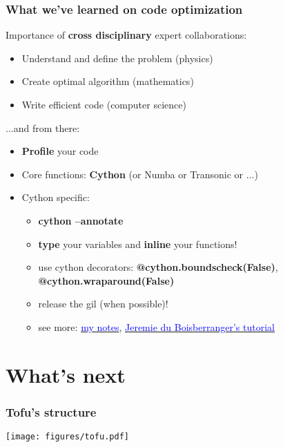 \documentclass[10pt]{beamer}
\begin{document}
\begin{frame}
\frametitle{What we've learned on code optimization}

Importance of \textbf{cross disciplinary} expert collaborations:

	\begin{itemize}
		\item Understand and define the problem (physics)
		\item Create optimal algorithm (mathematics)
		\item Write efficient code (computer science)
	\end{itemize}

...and from there:

	\begin{itemize}
		\item \textbf{Profile} your code
		\item Core functions: \textbf{Cython} (or Numba or Transonic or ...)
		\item Cython specific:
		\begin{itemize}
			\item \textbf{cython --annotate}
			\item \textbf{type} your variables and \textbf{inline} your functions!
			\item use cython decorators: \textbf{@cython.boundscheck(False)}, \textbf{@cython.wraparound(False)}
			\item release the gil (when possible)!
			\item see more: \href{https://github.com/ToFuProject/tofu/blob/master/Notebooks/Cython_speedup_notes.ipynb}{\textcolor{blue}{my notes}}, \href{https://github.com/jeremiedbb/tutorial-euroscipy-2019}{\textcolor{blue}{Jeremie du Boisberranger's tutorial}}
			
		\end{itemize}
	\end{itemize}
	
\end{frame}


\section{What's next}


\begin{frame}
\frametitle{Tofu's structure}

\begin{center}
    	\texttt{[image: figures/tofu.pdf]}
\end{center}
	
\end{frame}
\end{document}
